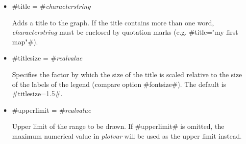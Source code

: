 \begin{itemize}
\item #title = #{\em characterstring}

Adds a title to the graph. If the title contains more than one
word, {\em characterstring} must be enclosed by quotation marks
(e.g. #title="my first map"#).

\item #titlesize = #{\em realvalue}

Specifies the factor by which the size of the title is scaled
relative to the size of the labels of the legend (compare option
#fontsize#). The default is #titlesize=1.5#.

\item #upperlimit = #{\em realvalue}

Upper limit of the range to be drawn. If #upperlimit# is omitted,
the maximum numerical value in {\em plotvar} will be used as the
upper limit instead.

\end{itemize}


